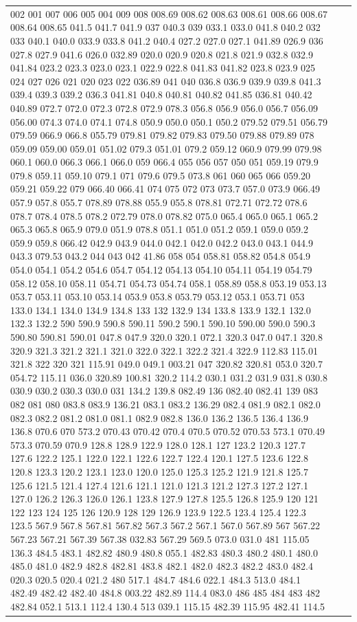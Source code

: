 \documentclass[3p,super,numbers,sort&compress,preprint,10pt]{elsarticle}
\begin{document}
\begin{longtable}{|L{.1in}|L{.6in}||L{5.65in}|}
002 001 007 006 005 004 009 008 008.69 008.62 008.63 008.61 008.66 008.67 008.64 008.65 041.5 041.7 041.9 037 040.3 039 033.1 033.0 041.8 040.2 032 033 040.1 040.0 033.9 033.8 041.2 040.4 027.2 027.0 027.1 041.89 026.9 036 027.8 027.9 041.6 026.0 032.89 020.0 020.9 020.8 021.8 021.9 032.8 032.9 041.84 023.2 023.3 023.0 023.1 022.9 022.8 041.83 041.82 023.8 023.9 025 024 027 026 021 020 023 022 036.89 041 040 036.8 036.9 039.9 039.8 041.3 039.4 039.3 039.2 036.3 041.81 040.8 040.81 040.82 041.85 036.81 040.42 040.89 072.7 072.0 072.3 072.8 072.9 078.3 056.8 056.9 056.0 056.7 056.09 056.00 074.3 074.0 074.1 074.8 050.9 050.0 050.1 050.2 079.52 079.51 056.79 079.59 066.9 066.8 055.79 079.81 079.82 079.83 079.50 079.88 079.89 078 059.09 059.00 059.01 051.02 079.3 051.01 079.2 059.12 060.9 079.99 079.98 060.1 060.0 066.3 066.1 066.0 059 066.4 055 056 057 050 051 059.19 079.9 079.8 059.11 059.10 079.1 071 079.6 079.5 073.8 061 060 065 066 059.20 059.21 059.22 079 066.40 066.41 074 075 072 073 073.7 057.0 073.9 066.49 057.9 057.8 055.7 078.89 078.88 055.9 055.8 078.81 072.71 072.72 078.6 078.7 078.4 078.5 078.2 072.79 078.0 078.82 075.0 065.4 065.0 065.1 065.2 065.3 065.8 065.9 079.0 051.9 078.8 051.1 051.0 051.2 059.1 059.0 059.2 059.9 059.8 066.42 042.9 043.9 044.0 042.1 042.0 042.2 043.0 043.1 044.9 043.3 079.53 043.2 044 043 042 41.86 058 054 058.81 058.82 054.8 054.9 054.0 054.1 054.2 054.6 054.7 054.12 054.13 054.10 054.11 054.19 054.79 058.12 058.10 058.11 054.71 054.73 054.74 058.1 058.89 058.8 053.19 053.13 053.7 053.11 053.10 053.14 053.9 053.8 053.79 053.12 053.1 053.71 053 133.0 134.1 134.0 134.9 134.8 133 132 132.9 134 133.8 133.9 132.1 132.0 132.3 132.2 590 590.9 590.8 590.11 590.2 590.1 590.10 590.00 590.0 590.3 590.80 590.81 590.01 047.8 047.9 320.0 320.1 072.1 320.3 047.0 047.1 320.8 320.9 321.3 321.2 321.1 321.0 322.0 322.1 322.2 321.4 322.9 112.83 115.01 321.8 322 320 321 115.91 049.0 049.1 003.21 047 320.82 320.81 053.0 320.7 054.72 115.11 036.0 320.89 100.81 320.2 114.2 030.1 031.2 031.9 031.8 030.8 030.9 030.2 030.3 030.0 031 134.2 139.8 082.49 136 082.40 082.41 139 083 082 081 080 083.8 083.9 136.21 083.1 083.2 136.29 082.4 081.9 082.1 082.0 082.3 082.2 081.2 081.0 081.1 082.9 082.8 136.0 136.2 136.5 136.4 136.9 136.8 070.6 070 573.2 070.43 070.42 070.4 070.5 070.52 070.53 573.1 070.49 573.3 070.59 070.9 128.8 128.9 122.9 128.0 128.1 127 123.2 120.3 127.7 127.6 122.2 125.1 122.0 122.1 122.6 122.7 122.4 120.1 127.5 123.6 122.8 120.8 123.3 120.2 123.1 123.0 120.0 125.0 125.3 125.2 121.9 121.8 125.7 125.6 121.5 121.4 127.4 121.6 121.1 121.0 121.3 121.2 127.3 127.2 127.1 127.0 126.2 126.3 126.0 126.1 123.8 127.9 127.8 125.5 126.8 125.9 120 121 122 123 124 125 126 120.9 128 129 126.9 123.9 122.5 123.4 125.4 122.3 123.5 567.9 567.8 567.81 567.82 567.3 567.2 567.1 567.0 567.89 567 567.22 567.23 567.21 567.39 567.38 032.83 567.29 569.5 073.0 031.0 481 115.05 136.3 484.5 483.1 482.82 480.9 480.8 055.1 482.83 480.3 480.2 480.1 480.0 485.0 481.0 482.9 482.8 482.81 483.8 482.1 482.0 482.3 482.2 483.0 482.4 020.3 020.5 020.4 021.2 480 517.1 484.7 484.6 022.1 484.3 513.0 484.1 482.49 482.42 482.40 484.8 003.22 482.89 114.4 083.0 486 485 484 483 482 482.84 052.1 513.1 112.4 130.4 513 039.1 115.15 482.39 115.95 482.41 114.5 
\end{longtable}
\end{document}
